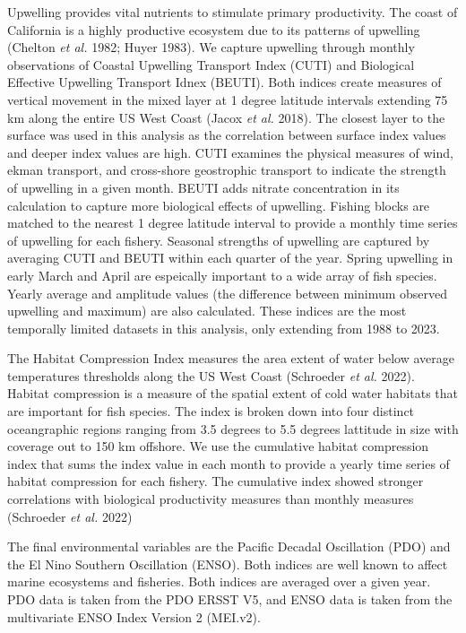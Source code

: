 \documentclass[
  letterpaper,
  DIV=11,
  numbers=noendperiod]{scrartcl}
\begin{document}
Upwelling provides vital nutrients to stimulate primary productivity.
The coast of California is a highly productive ecosystem due to its
patterns of upwelling (Chelton \emph{et al.} 1982; Huyer 1983). We
capture upwelling through monthly observations of Coastal Upwelling
Transport Index (CUTI) and Biological Effective Upwelling Transport
Idnex (BEUTI). Both indices create measures of vertical movement in the
mixed layer at 1 degree latitude intervals extending 75 km along the
entire US West Coast (Jacox \emph{et al.} 2018). The closest layer to
the surface was used in this analysis as the correlation between surface
index values and deeper index values are high. CUTI examines the
physical measures of wind, ekman transport, and cross-shore geostrophic
transport to indicate the strength of upwelling in a given month. BEUTI
adds nitrate concentration in its calculation to capture more biological
effects of upwelling. Fishing blocks are matched to the nearest 1 degree
latitude interval to provide a monthly time series of upwelling for each
fishery. Seasonal strengths of upwelling are captured by averaging CUTI
and BEUTI within each quarter of the year. Spring upwelling in early
March and April are espeically important to a wide array of fish
species. Yearly average and amplitude values (the difference between
minimum observed upwelling and maximum) are also calculated. These
indices are the most temporally limited datasets in this analysis, only
extending from 1988 to 2023.

The Habitat Compression Index measures the area extent of water below
average temperatures thresholds along the US West Coast (Schroeder
\emph{et al.} 2022). Habitat compression is a measure of the spatial
extent of cold water habitats that are important for fish species. The
index is broken down into four distinct oceangraphic regions ranging
from 3.5 degrees to 5.5 degrees lattitude in size with coverage out to
150 km offshore. We use the cumulative habitat compression index that
sums the index value in each month to provide a yearly time series of
habitat compression for each fishery. The cumulative index showed
stronger correlations with biological productivity measures than monthly
measures (Schroeder \emph{et al.} 2022)

The final environmental variables are the Pacific Decadal Oscillation
(PDO) and the El Nino Southern Oscillation (ENSO). Both indices are well
known to affect marine ecosystems and fisheries. Both indices are
averaged over a given year. PDO data is taken from the PDO ERSST V5, and
ENSO data is taken from the multivariate ENSO Index Version 2 (MEI.v2).
\end{document}
